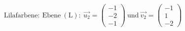 \documentclass[preview]{standalone}
\begin{document}
\begin{center}
$\mathrm{Lilafarbene :\ Ebene \: (L):} \: \vec{u_2} = \begin{pmatrix} -1 \\ -2 \\ -1 \end{pmatrix} \: \mathrm{und} \: \vec{v_2} = \begin{pmatrix} -1 \\ 1 \\ -2 \end{pmatrix}$
\end{center}
\end{document}
